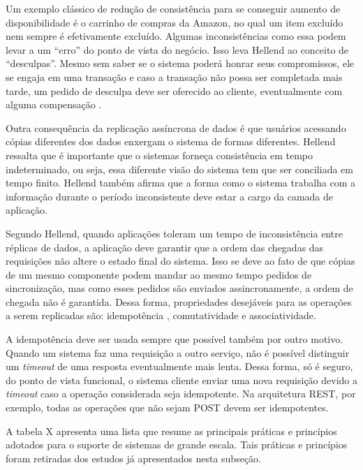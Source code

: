 Um exemplo clássico de redução de consistência para se conseguir aumento de disponibilidade é o carrinho de compras da Amazon, no qual um item excluído nem sempre é efetivamente excluído. Algumas inconsistências como essa podem levar a um ``erro'' do ponto de vista do negócio. Isso leva Hellend ao conceito de ``desculpas''. Mesmo sem saber se o sistema poderá honrar seus compromissos, ele se engaja em uma transação e caso a transação não possa ser completada mais tarde, um pedido de desculpa deve ser oferecido ao cliente, eventualmente com alguma compensação .

Outra consequência da replicação assíncrona de dados é que usuários acessando cópias diferentes dos dados enxergam o sistema de formas diferentes. Hellend ressalta que é importante que o sistemas forneça consistência em tempo indeterminado, ou seja, essa diferente visão do sistema tem que ser conciliada em tempo finito. Hellend também afirma que a forma como o sistema trabalha com a informação durante o período inconsistente deve estar a cargo da camada de aplicação. 

Segundo Hellend, quando aplicações toleram um tempo de inconsistência entre réplicas de dados, a aplicação deve garantir que a ordem das chegadas das requisições não altere o estado final do sistema. Isso se deve ao fato de que cópias de um mesmo componente podem mandar ao mesmo tempo pedidos de sincronização, mas como esses pedidos são enviados assincronamente, a ordem de chegada não é garantida. Dessa forma, propriedades desejáveis para as operações a serem replicadas são: idempotência , comutatividade e associatividade.

A idempotência deve ser usada sempre que possível também por outro motivo. Quando um sistema faz uma requisição a outro serviço, não é possível distinguir um \emph{timeout} de uma resposta eventualmente mais lenta. Dessa forma, só é seguro, do ponto de vista funcional, o sistema cliente enviar uma nova requisição devido a \emph{timeout} caso a operação considerada seja idempotente. Na arquitetura REST, por exemplo, todas as operações que não sejam POST devem ser idempotentes.

A tabela X apresenta uma lista que resume as principais práticas e princípios adotados para o suporte de sistemas de grande escala. Tais práticas e princípios foram retiradas dos estudos já apresentados nesta subseção.

